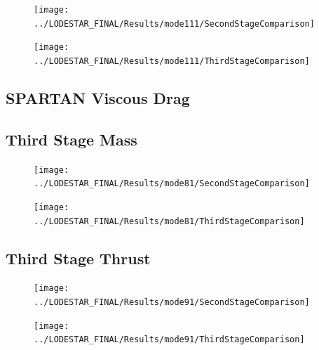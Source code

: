 \begin{figure}[th]
\centering
\texttt{[image: ../LODESTAR\_FINAL/Results/mode111/SecondStageComparison]}
\caption{}
\label{fig:SecondStageComparison13}
\end{figure}

\begin{figure}[th]
\centering
\texttt{[image: ../LODESTAR\_FINAL/Results/mode111/ThirdStageComparison]}
\caption{}
\label{fig:ThirdStageComparison13}
\end{figure}


\subsection{SPARTAN Viscous Drag}



\subsection{Third Stage Mass}
\begin{figure}[th]
\centering
\texttt{[image: ../LODESTAR\_FINAL/Results/mode81/SecondStageComparison]}
\caption{}
\label{fig:SecondStageComparison14}
\end{figure}

\begin{figure}[th]
\centering
\texttt{[image: ../LODESTAR\_FINAL/Results/mode81/ThirdStageComparison]}
\caption{}
\label{fig:ThirdStageComparison14}
\end{figure}



\subsection{Third Stage Thrust}

\begin{figure}[th]
\centering
\texttt{[image: ../LODESTAR\_FINAL/Results/mode91/SecondStageComparison]}
\caption{}
\label{fig:SecondStageComparison15}
\end{figure}


\begin{figure}[th]
\centering
\texttt{[image: ../LODESTAR\_FINAL/Results/mode91/ThirdStageComparison]}
\caption{}
\label{fig:ThirdStageComparison15}
\end{figure}



